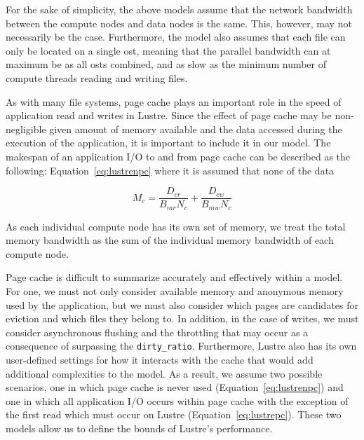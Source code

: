 \documentclass{report}
\begin{document}
    For the sake of simplicity, the above models assume that the network bandwidth
    between the compute nodes and data nodes is the same. This, however, may not
    necessarily be the case. Furthermore, the model also assumes that each file can
    only be located on a single \gls{ost}, meaning that the parallel bandwidth can at maximum be
    as all \gls{ost}s combined, and as slow as the minimum number of compute threads
    reading and writing files.

    As with many file systems, page cache plays an important role in the speed of
    application read and writes in Lustre. Since the effect of page cache may be
    non-negligible given amount of memory available and the data accessed during the
    execution of the application, it is important to include it in our model. The makespan
    of an application I/O to and from page cache can be described as the following:
    Equation~\ref{eq:lustrenpc} where it is assumed that none of the data 


    \begin{equation}\label{eq:cache}
        M_{c} = \frac{D_{cr}}{B_{mr}N_{c}} + \frac{D_{cw}}{B_{mw}N_{c}}
    \end{equation}
    

    As each individual compute node has its own set of memory, we treat the total 
    memory bandwidth as the sum of the individual memory bandwidth of each compute node.


    Page cache is difficult to summarize accurately and effectively within a model.
    For one, we must not only consider available memory and anonymous memory used by
    the application, but we must also consider which pages are candidates for eviction
    and which files they belong to. In addition, in the case of writes, we must consider
    asynchronous flushing and the throttling that may occur as a consequence of surpassing
    the \texttt{dirty\_ratio}. Furthermore, Lustre also has its own user-defined settings
    for how it interacts with the cache that would add additional complexities to the model.
    As a result, we assume two possible scenarios, one in which page cache is never used (Equation~\ref{eq:lustrenpc})
    and one in which all application I/O occurs within page cache with the exception of the
    first read which must occur on Lustre (Equation~\ref{eq:lustrepc}). These two models allow
    us to define the bounds of Lustre's performance.
\end{document}
